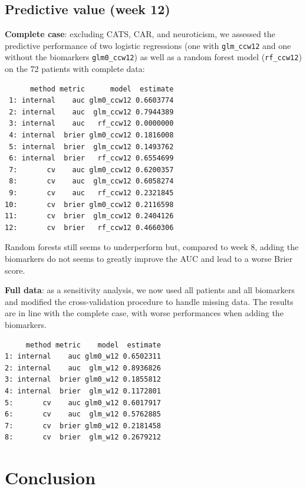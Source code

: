 \documentclass[12pt]{article}
\begin{document}
\subsection{Predictive value (week 12)}
\label{sec:orgec70e35}

\textbf{Complete case}: excluding CATS, CAR, and neuroticism, we assessed the
predictive performance of two logistic regressions (one with
\texttt{glm\_ccw12} and one without the biomarkers \texttt{glm0\_ccw12}) as well as a
random forest model (\texttt{rf\_ccw12}) on the 72 patients with complete data:
\begin{verbatim}
      method metric      model  estimate
 1: internal    auc glm0_ccw12 0.6603774
 2: internal    auc  glm_ccw12 0.7944389
 3: internal    auc   rf_ccw12 0.0000000
 4: internal  brier glm0_ccw12 0.1816008
 5: internal  brier  glm_ccw12 0.1493762
 6: internal  brier   rf_ccw12 0.6554699
 7:       cv    auc glm0_ccw12 0.6200357
 8:       cv    auc  glm_ccw12 0.6058274
 9:       cv    auc   rf_ccw12 0.2321845
10:       cv  brier glm0_ccw12 0.2116598
11:       cv  brier  glm_ccw12 0.2404126
12:       cv  brier   rf_ccw12 0.4660306
\end{verbatim}

Random forests still seems to underperform but, compared to week 8,
adding the biomarkers do not seems to greatly improve the AUC and lead
to a worse Brier score.

\bigskip

\textbf{Full data}: as a sensitivity analysis, we now used all patients and
all biomarkers and modified the cross-validation procedure to handle
missing data. The results are in line with the complete case, with
worse performances when adding the biomarkers.

\begin{verbatim}
     method metric    model  estimate
1: internal    auc glm0_w12 0.6502311
2: internal    auc  glm_w12 0.8936826
3: internal  brier glm0_w12 0.1855812
4: internal  brier  glm_w12 0.1172801
5:       cv    auc glm0_w12 0.6017917
6:       cv    auc  glm_w12 0.5762885
7:       cv  brier glm0_w12 0.2181458
8:       cv  brier  glm_w12 0.2679212
\end{verbatim}


\clearpage

\section{Conclusion}
\label{sec:org2387613}
\end{document}
